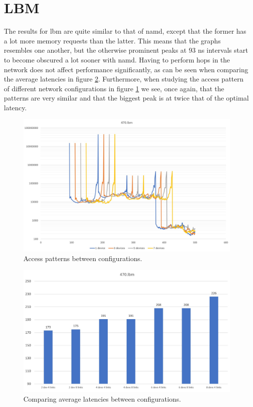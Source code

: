 \section{LBM}
The results for lbm are quite similar to that of namd, except that the former has a lot more memory requests than the latter. This means that the graphs resembles one another, but the otherwise prominent peaks at 93 ns intervals start to become obscured a lot sooner with namd. Having to perform hops in the network does not affect performance significantly, as can be seen when comparing the average latencies in figure \ref{Memory-access-470-averages}. Furthermore, when studying the access pattern of different network configurations in figure \ref{Memory-access-470} we see, once again, that the patterns are very similar and that the biggest peak is at twice that of the optimal latency.
\bigskip

\begin{figure}[!ht]
    \centering
    \includegraphics[width=1.0\linewidth]{figure/470-x_4.jpg}
    \caption{Access patterns between configurations.}
    \label{Memory-access-470}
\end{figure}
\begin{figure}[!ht]
    \centering
    \includegraphics[width=1.0\linewidth]{figure/470-averages.jpg}
    \caption{Comparing average latencies between configurations.}
    \label{Memory-access-470-averages}
\end{figure}

